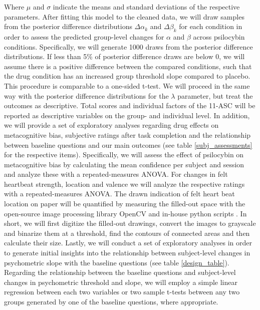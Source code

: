 \documentclass{article}
\begin{document}
Where $\mu$ and $\sigma$ indicate the means and standard deviations of the respective parameters.
After fitting this model to the cleaned data, we will draw samples from the posterior difference distributions $\Delta\alpha_{k}$ and $\Delta\beta_{k}$ for each condition in order to assess the predicted group-level changes for $\alpha$ and $\beta$ across psilocybin conditions. Specifically, we will generate 1000 draws from the posterior difference distributions. If less than 5\% of posterior difference draws are below 0, we will assume there is a positive difference between the compared conditions, such that the drug condition has an increased group threshold slope compared to placebo. This procedure is comparable to a one-sided t-test.
We will proceed in the same way with the posterior difference distributions for the $\lambda$ parameter, but treat the outcomes as descriptive. Total scores and individual factors of the 11-ASC will be reported as descriptive variables on the group- and individual level.
In addition, we will provide a set of exploratory analyses regarding drug effects on metacognitive bias, subjective ratings after task completion and the relationship between baseline questions and our main outcomes (see table \ref{subj_assessments} for the respective items). Specifically, we will assess the effect of psilocybin on metacognitive bias by calculating the mean confidence per subject and session and analyze these with a repeated-measures ANOVA. 
For changes in felt heartbeat strength, location and valence we will analyze the respective ratings with a repeated-measures ANOVA. The drawn indication of felt heart beat location on paper will be quantified by measuring the filled-out space with the open-source image processing library OpenCV and in-house python scripts \parencite{opencv_library}. In short, we will first digitize the filled-out drawings, convert the images to grayscale and binarize them at a threshold, find the contours of connected areas and then calculate their size. 
Lastly, we will conduct a set of exploratory analyses in order to generate initial insights into the relationship between subject-level changes in psychometric slope with the baseline questions (see table \ref{design_table}). Regarding the relationship between the baseline questions and subject-level changes in psychometric threshold and slope, we will employ a simple linear regression between each two variables or two sample t-tests between any two groups generated by one of the baseline questions, where appropriate. 
\end{document}
